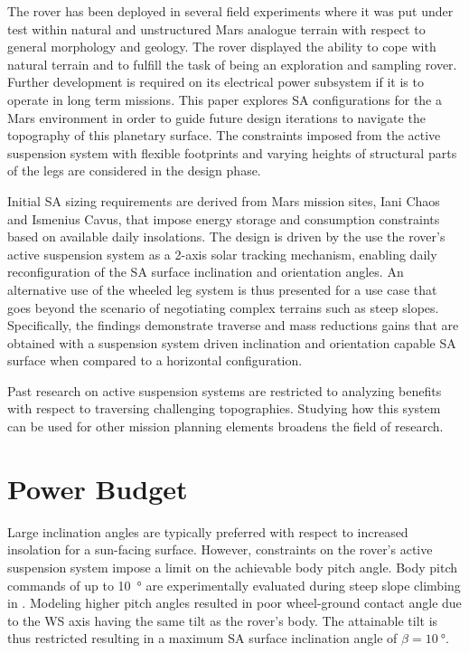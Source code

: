 \documentclass[twocolumn,letterpaper]{IEEEAerospaceCLS}  %
\begin{document}
The rover has been deployed in several field experiments where it was put under test within natural and unstructured Mars analogue terrain with respect to general morphology and geology. The rover displayed the ability to cope with natural terrain and to fulfill the task of being an exploration and sampling rover. Further development is required on its electrical power subsystem if it is to operate in long term missions. This paper explores \ac{SA} configurations for the a Mars environment in order to guide future design iterations to navigate the topography of this planetary surface. The constraints imposed from the active suspension system with flexible footprints and varying heights of structural parts of the legs are considered in the design phase.

Initial \ac{SA} sizing requirements are derived from Mars mission sites, Iani Chaos and Ismenius Cavus, that impose energy storage and consumption constraints based on available daily insolations. The design is driven by the use the rover's active suspension system as a 2-axis solar tracking mechanism, enabling daily reconfiguration of the \ac{SA} surface inclination and orientation angles. An alternative use of the wheeled leg system is thus presented for a use case that goes beyond the scenario of negotiating complex terrains such as steep slopes. Specifically, the findings demonstrate traverse and mass reductions gains that are obtained with a suspension system driven inclination and orientation capable \ac{SA} surface when compared to a horizontal configuration.

Past research on active suspension systems are restricted to analyzing benefits with respect to traversing challenging topographies. Studying how this system can be used for other mission planning elements broadens the field of research.

\section{Power Budget}

Large inclination angles are typically preferred with respect to increased insolation for a sun-facing surface. However, constraints on the rover's active suspension system impose a limit on the achievable body pitch angle. Body pitch commands of up to \SI{10}{\degree} are experimentally evaluated during steep slope climbing in \cite{Cordes2018a}. Modeling higher pitch angles resulted in poor wheel-ground contact angle due to the \ac{WS} axis having the same tilt as the rover's body. The attainable tilt is thus restricted resulting in a maximum \ac{SA} surface inclination angle of $\beta = \SI{10}{\degree}$.
\end{document}

